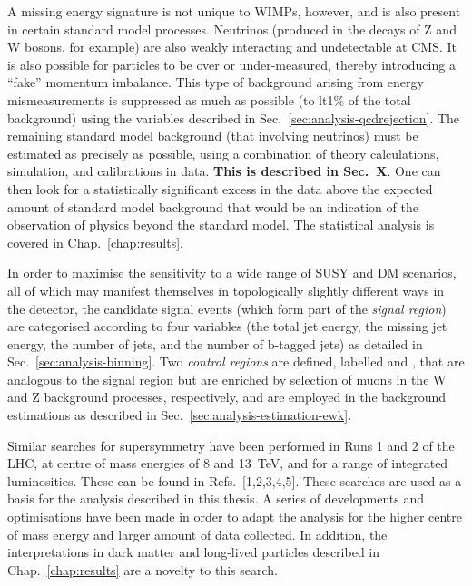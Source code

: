 A missing energy signature is not unique to WIMPs, however, and is also present 
in certain standard model processes. Neutrinos (produced in the decays of Z and 
W bosons, for example) are also weakly interacting and undetectable at CMS. It 
is also possible for particles to be over or under-measured, thereby 
introducing a ``fake'' momentum imbalance. This type of background arising from 
energy mismeasurements is suppressed as much as possible (to lt1\% of the total 
background) using the variables described in 
Sec.~\ref{sec:analysis-qcdrejection}. The remaining standard 
model background (that involving neutrinos) must be estimated as precisely as 
possible, using a combination of theory calculations, simulation, and 
calibrations in data. \textbf{This is described in Sec.~X}. One can then look 
for a 
statistically significant excess in the data above the expected amount of 
standard model background that would be an indication of the observation of 
physics beyond the standard model. The statistical analysis is covered in 
Chap.~\ref{chap:results}.

In order to maximise the sensitivity to a wide range of SUSY and DM scenarios, 
all of which may manifest themselves in topologically slightly different ways 
in the detector, the candidate signal events (which form part of the 
\textit{signal region}) are categorised according to four variables (the total 
jet energy, the missing jet energy, the number of jets, and the number of 
b-tagged jets) as detailed 
in Sec.~\ref{sec:analysis-binning}. Two \textit{control regions} are defined, 
labelled \mj and 
\mmj, that are analogous to the signal region but are enriched by 
selection of muons in the W and Z background processes, respectively, and are 
employed in the background estimations as described in 
Sec.~\ref{sec:analysis-estimation-ewk}.

Similar searches for supersymmetry have been performed in Runs 1 and 2 of the 
LHC, at centre of mass energies of 8 and 13~TeV, and for a range of 
integrated luminosities. These can be found in Refs.~[1,2,3,4,5]. These 
searches are used as a basis for the analysis described in this thesis. A 
series of developments and optimisations have been made in order to adapt the 
analysis for the higher centre of mass energy and larger amount of data 
collected. In addition, the interpretations in dark matter and long-lived 
particles described in Chap.~\ref{chap:results} are a novelty to this search.

